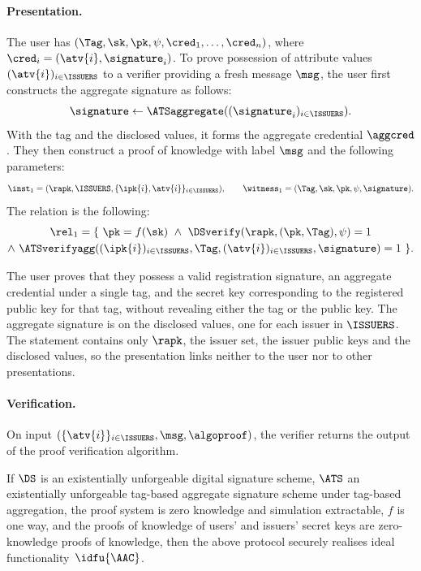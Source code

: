 \paragraph{Presentation.} The user has $(\Tag, \sk, \pk, \psi, \cred_1, \ldots, \cred_n)$, where $\cred_i
= (\atv{i}, \signature_i)$.  To prove possession of attribute values
$(\atv{i})_{i \in \ISSUERS}$ to a verifier providing a fresh message $\msg$, the
user first constructs the aggregate signature as follows:
%
\begin{equation*}
%
  \signature \leftarrow \ATSaggregate((\signature_i)_{i \in \ISSUERS}).
\end{equation*}
%
With the tag and the disclosed values, it forms the aggregate credential
$\aggcred$. They then construct a proof of knowledge with label $\msg$ and the
following parameters:
%
\begin{equation*}
%
  \inst_1 = (\rapk, \ISSUERS, \{\ipk{i}, \atv{i}\}_{i \in \ISSUERS}), \qquad
\witness_1 = (\Tag, \sk, \pk, \psi, \signature).
%
\end{equation*}
%
The relation is the following:
%
\begin{equation}\label{eq:agg-creds-proof-abstract} \begin{gathered}
%
  \rel_1 = \{\ \pk = f(\sk) \ \wedge \
\DSverify(\rapk, (\pk, \Tag), \psi) = 1 \\
%
  \wedge\ \ATSverifyagg((\ipk{i})_{i \in \ISSUERS}, \Tag, (\atv{i})_{i \in
\ISSUERS}, \signature) = 1\ \}.
%
\end{gathered} \end{equation}

The user proves that they possess a valid registration signature, an aggregate
credential under a single tag, and the secret key corresponding to the
registered public key for that tag, without revealing either the tag or the
public key. The aggregate signature is on the disclosed values, one for each
issuer in $\ISSUERS$. The statement contains only $\rapk$, the issuer set, the
issuer public keys and the disclosed values, so the presentation links neither
to the user nor to other presentations.

\paragraph{Verification.} On input $(\{\atv{i}\}_{i \in \ISSUERS}, \msg, \algoproof)$, the verifier
returns the output of the proof verification algorithm.

\begin{theorem}\label{thm:agg-creds-construction-security} If $\DS$ is an
existentially unforgeable digital signature scheme, $\ATS$ an existentially
unforgeable tag-based aggregate signature scheme under tag-based aggregation,
the proof system is zero knowledge and simulation extractable, $f$ is one way,
and the proofs of knowledge of users' and issuers' secret keys are
zero-knowledge proofs of knowledge, then the above protocol securely realises
ideal functionality~$\idfu{\AAC}$.  \end{theorem}


